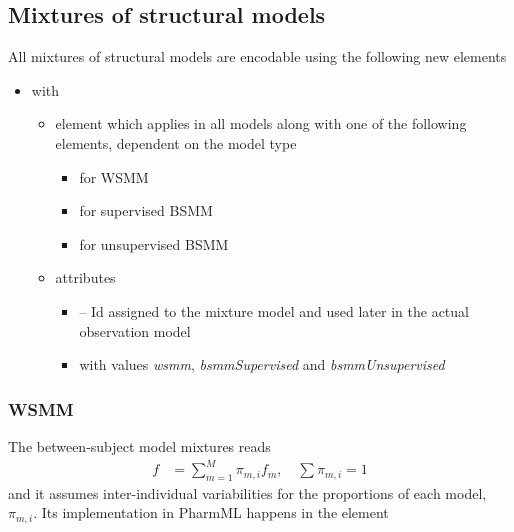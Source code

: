 \subsection{Mixtures of structural models}
\label{sec:mixStructModels}

All mixtures of structural models are encodable using 
the following new elements
\begin{itemize}
\item 
{} with 
\begin{itemize}
\item 
{} element which applies in all models
along with one of the following elements, dependent on the model type
\begin{itemize}
\item 
{} for WSMM
\item 
{} for supervised BSMM
\item 
{} for unsupervised BSMM
\end{itemize}
\item
attributes 
\begin{itemize}
\item 
{} -- Id assigned to the mixture model and used later in the 
actual observation model
\item 
{} with values \textit{wsmm}, \textit{bsmmSupervised} and \textit{bsmmUnsupervised}
\end{itemize}\end{itemize}
\end{itemize}


\subsubsection{WSMM}
\label{subsec:wsmm}
The between-subject model mixtures reads
\begin{align}
f &= \sum^M_{m=1} \pi_{m,i} f_m, \quad \sum \pi_{m,i} = 1	\nonumber
\end{align}
and it assumes inter-individual variabilities for the proportions 
of each model, $\pi_{m,i}$. Its implementation in PharmML happens 
in the  element 

